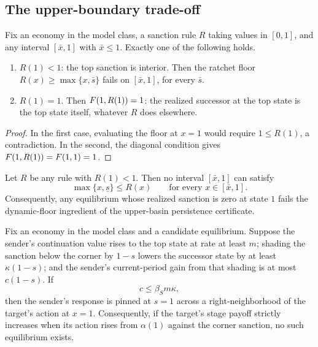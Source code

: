 \subsection{The upper-boundary trade-off}
\label{sec:absorbing-obstruction}

\begin{proposition}
\label{prop:ratchet-dichotomy}
Fix an economy in the model class, a sanction rule $R$ taking
values in $[0,1]$, and any interval $[\bar x,1]$ with $\bar x\le1$.
Exactly one of the following holds.
\begin{enumerate}[label=(\roman*),nosep,leftmargin=2.2em]
\item $R(1)<1$: the top sanction is interior. Then the ratchet floor
$R(x)\ge\max\{x,\bar s\}$ fails on $[\bar x,1]$, for every $\bar s$.
\item $R(1)=1$. Then $F(1,R(1))=1$: the realized successor at the top
state is the top state itself, whatever $R$ does elsewhere.
\end{enumerate}
\end{proposition}

\begin{proof}
In the first case, evaluating the floor at $x=1$ would require
$1\le R(1)$, a contradiction. In the second, the diagonal condition
gives $F(1,R(1))=F(1,1)=1$.
\end{proof}

\begin{corollary}
\label{cor:endpoint-obstruction}
Let $R$ be any rule with $R(1)<1$. Then no interval
$[\bar x,1]$ can satisfy
\[
\max\{x,\underline s\}\le R(x)
\qquad\text{for every }x\in[\bar x,1].
\]
Consequently, any equilibrium whose realized sanction is zero at state
$1$ fails the dynamic-floor ingredient of the upper-basin persistence
certificate.
\end{corollary}

\begin{proposition}
\label{prop:absorbing-obstruction}
Fix an economy in the model class and a candidate equilibrium. Suppose
the sender's continuation value rises to the top state at rate at least
$m$; shading the sanction below the corner by $1-s$ lowers the successor
state by at least $\kappa(1-s)$; and the sender's current-period gain
from that shading is at most $c(1-s)$. If
\[
c\le\beta_Sm\kappa,
\]
then the sender's response is pinned at $s=1$ across a
right-neighborhood of the target's action at $x=1$. Consequently, if
the target's stage payoff strictly increases when its action rises from
$\alpha(1)$ against the corner sanction, no such equilibrium exists.
\end{proposition}


